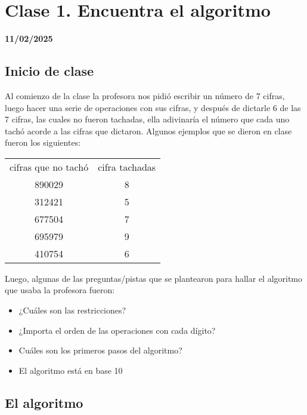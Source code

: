 \chapter{Clase 1. Encuentra el algoritmo}
\textbf{11/02/2025}
\section{Inicio de clase}

Al comienzo de la clase la profesora nos pidió escribir un número de 7 cifras, luego hacer una serie de operaciones con sus cifras, y después de dictarle 6 de las 7 cifras, las cuales no fueron tachadas, ella adivinaría el número que cada uno tachó acorde a las cifras que dictaron. Algunos ejemplos que se dieron en clase fueron los siguientes:
    \\
    \begin{center}
        \begin{tabular}{c|c}
            cifras que no tachó & cifra tachadas\\
            890029 & 8\\
            312421 & 5\\
            677504 & 7\\
            695979 & 9\\
            410754 & 6\\
        \end{tabular}
    \end{center}
    
Luego, algunas de las preguntas/pistas que se plantearon para hallar el algoritmo que usaba la profesora fueron:\\

    \begin{itemize}
        \item ¿Cuáles son las restricciones?
        \item ¿Importa el orden de las operaciones con cada dígito?
        \item Cuáles son los primeros pasos del algoritmo?
        \item El algoritmo está en base 10
    \end{itemize}

\section{El algoritmo}
